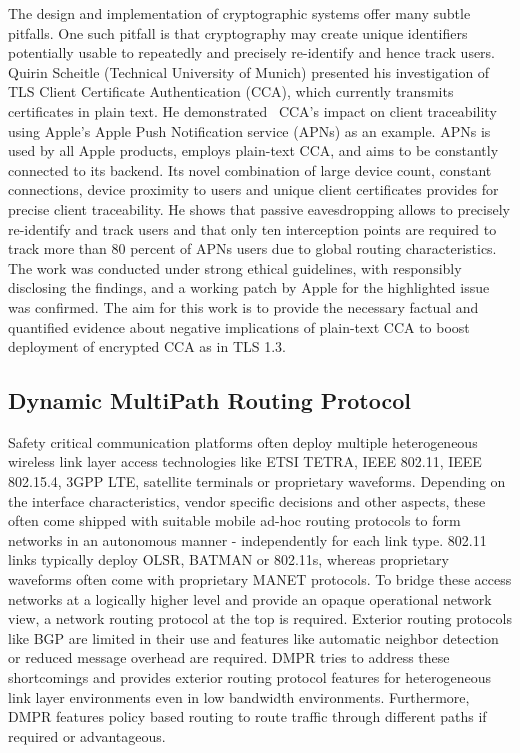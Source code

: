 The design and implementation of cryptographic systems offer many subtle
pitfalls. One such pitfall is that cryptography may create unique identifiers
potentially usable to repeatedly and precisely re-identify and hence track
users. Quirin Scheitle (Technical University of Munich) presented his investigation of TLS Client
Certificate Authentication (CCA), which currently transmits certificates in
plain text. He demonstrated~\cite{qscheitle:tma:2017} CCA’s impact on client
traceability using Apple’s Apple Push Notification service (APNs) as an
example. APNs is used by all Apple products, employs plain-text CCA, and aims
to be constantly connected to its backend. Its novel combination of large
device count, constant connections, device proximity to users and unique
client certificates provides for precise client traceability. He shows that
passive eavesdropping allows to precisely re-identify and track users and that
only ten interception points are required to track more than 80 percent of
APNs users due to global routing characteristics. The work was conducted under
strong ethical guidelines, with responsibly disclosing the findings, and a
working patch by Apple for the highlighted issue was confirmed. The aim for
this work is to provide the necessary factual and quantified evidence about
negative implications of plain-text CCA to boost deployment of encrypted CCA
as in TLS 1.3.


\subsection{Dynamic MultiPath Routing Protocol}

Safety critical communication platforms often deploy multiple heterogeneous
wireless link layer access technologies like ETSI TETRA, IEEE 802.11, IEEE
802.15.4, 3GPP LTE, satellite terminals or proprietary waveforms.  Depending
on the interface characteristics, vendor specific decisions and other aspects,
these often come shipped with suitable mobile ad-hoc routing protocols to form
networks in an autonomous manner - independently for each link type. 802.11
links typically deploy OLSR, BATMAN or 802.11s, whereas proprietary waveforms
often come with proprietary MANET protocols.  To bridge these access networks
at a logically higher level and provide an opaque operational network view, a
network routing protocol at the top is required. Exterior routing protocols
like BGP are limited in their use and features like automatic neighbor
detection or reduced message overhead are required. \ac{DMPR} tries to address
these shortcomings and provides exterior routing protocol features for
heterogeneous link layer environments even in low bandwidth environments.
Furthermore, \ac{DMPR} features policy based routing to route traffic through
different paths if required or advantageous.

